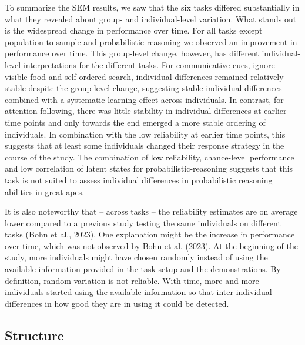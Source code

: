 \documentclass[
  man,floatsintext]{apa6}
\begin{document}
To summarize the SEM results, we saw that the six tasks differed substantially in what they revealed about group- and individual-level variation. What stands out is the widespread change in performance over time. For all tasks except population-to-sample and probabilistic-reasoning we observed an improvement in performance over time. This group-level change, however, has different individual-level interpretations for the different tasks. For communicative-cues, ignore-visible-food and self-ordered-search, individual differences remained relatively stable despite the group-level change, suggesting stable individual differences combined with a systematic learning effect across individuals. In contrast, for attention-following, there was little stability in individual differences at earlier time points and only towards the end emerged a more stable ordering of individuals. In combination with the low reliability at earlier time points, this suggests that at least some individuals changed their response strategy in the course of the study. The combination of low reliability, chance-level performance and low correlation of latent states for probabilistic-reasoning suggests that this task is not suited to assess individual differences in probabilistic reasoning abilities in great apes.

It is also noteworthy that -- across tasks -- the reliability estimates are on average lower compared to a previous study testing the same individuals on different tasks (Bohn et al., 2023). One explanation might be the increase in performance over time, which was not observed by Bohn et al. (2023). At the beginning of the study, more individuals might have chosen randomly instead of using the available information provided in the task setup and the demonstrations. By definition, random variation is not reliable. With time, more and more individuals started using the available information so that inter-individual differences in how good they are in using it could be detected.

\subsection{Structure}\label{structure}
\end{document}
